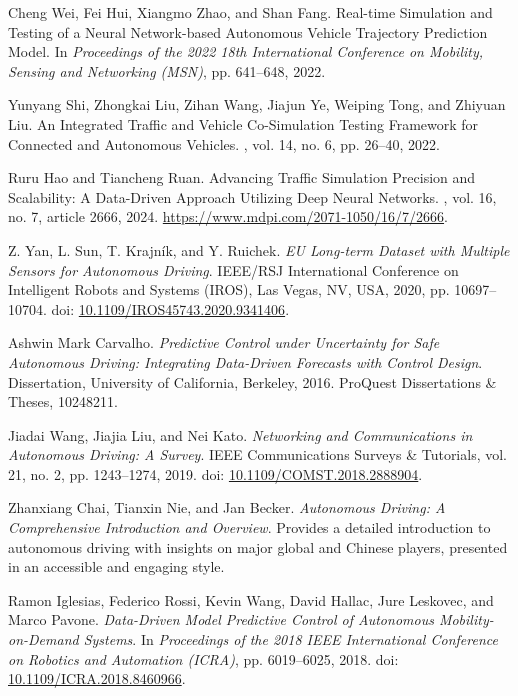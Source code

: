 \documentclass[lettersize,journal]{IEEEtran}
\begin{document}
\begin{thebibliography}{1}
Cheng Wei, Fei Hui, Xiangmo Zhao, and Shan Fang.
\newblock Real-time Simulation and Testing of a Neural Network-based Autonomous Vehicle Trajectory Prediction Model.
\newblock In {\em Proceedings of the 2022 18th International Conference on Mobility, Sensing and Networking (MSN)}, pp. 641--648, 2022.

Yunyang Shi, Zhongkai Liu, Zihan Wang, Jiajun Ye, Weiping Tong, and Zhiyuan Liu.
\newblock An Integrated Traffic and Vehicle Co-Simulation Testing Framework for Connected and Autonomous Vehicles.
, vol. 14, no. 6, pp. 26--40, 2022.

Ruru Hao and Tiancheng Ruan.
\newblock Advancing Traffic Simulation Precision and Scalability: A Data-Driven Approach Utilizing Deep Neural Networks.
, vol. 16, no. 7, article 2666, 2024.
\newblock \url{https://www.mdpi.com/2071-1050/16/7/2666}.

Z. Yan, L. Sun, T. Krajník, and Y. Ruichek.
\newblock \emph{EU Long-term Dataset with Multiple Sensors for Autonomous Driving}.
 IEEE/RSJ International Conference on Intelligent Robots and Systems (IROS), Las Vegas, NV, USA, 2020, pp. 10697–10704.
\newblock doi: \url{10.1109/IROS45743.2020.9341406}.

Ashwin Mark Carvalho.
\newblock \emph{Predictive Control under Uncertainty for Safe Autonomous Driving: Integrating Data-Driven Forecasts with Control Design}.
\newblock Dissertation, University of California, Berkeley, 2016.
\newblock ProQuest Dissertations \& Theses, 10248211.

Jiadai Wang, Jiajia Liu, and Nei Kato.
\newblock \emph{Networking and Communications in Autonomous Driving: A Survey}.
\newblock IEEE Communications Surveys \& Tutorials, vol. 21, no. 2, pp. 1243–1274, 2019.
\newblock doi: \url{10.1109/COMST.2018.2888904}.


Zhanxiang Chai, Tianxin Nie, and Jan Becker.
\newblock \emph{Autonomous Driving: A Comprehensive Introduction and Overview}.
\newblock Provides a detailed introduction to autonomous driving with insights on major global and Chinese players, presented in an accessible and engaging style.


Ramon Iglesias, Federico Rossi, Kevin Wang, David Hallac, Jure Leskovec, and Marco Pavone.
\newblock \emph{Data-Driven Model Predictive Control of Autonomous Mobility-on-Demand Systems}.
\newblock In \emph{Proceedings of the 2018 IEEE International Conference on Robotics and Automation (ICRA)}, pp. 6019–6025, 2018.
\newblock doi: \url{10.1109/ICRA.2018.8460966}.



\end{thebibliography}
\end{document}
